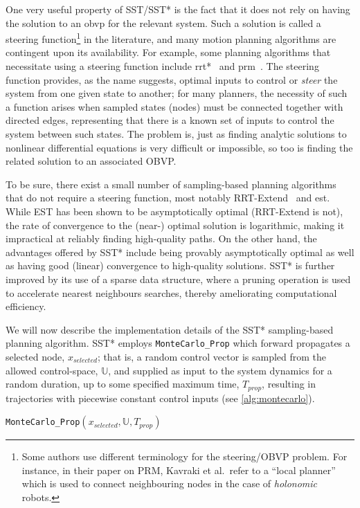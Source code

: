 One very useful property of SST/SST* is the fact that it does not rely on having the solution to an \gls{obvp} for the relevant system. Such a solution is called a steering function\footnote{Some authors use different terminology for the steering/OBVP problem. For instance, in their paper on PRM, Kavraki et al.\ refer to a ``local planner'' which is used to connect neighbouring nodes in the case of \emph{holonomic} robots.} in the literature, and many motion planning algorithms are contingent upon its availability. For example, some planning algorithms that necessitate using a steering function include \gls{rrt}*~\cite{Karaman2011} and \gls{prm}~\cite{Kavraki1996}. The steering function provides, as the name suggests, optimal inputs to control or \emph{steer} the system from one given state to another; for many planners, the necessity of such a function arises when sampled states (nodes) must be connected together with directed edges, representing that there is a known set of inputs to control the system between such states. The problem is, just as finding analytic solutions to nonlinear differential equations is very difficult or impossible, so too is finding the related solution to an associated OBVP\@.

To be sure, there exist a small number of sampling-based planning algorithms that do not require a steering function, most notably RRT-Extend~\cite{LaValle2001} and \gls{est}. While EST has been shown to be asymptotically optimal (RRT-Extend is not), the rate of convergence to the (near-) optimal solution is logarithmic, making it impractical at reliably finding high-quality paths. On the other hand, the advantages offered by SST* include being provably asymptotically optimal as well as having good (linear) convergence to high-quality solutions. SST* is further improved by its use of a sparse data structure, where a pruning operation is used to accelerate nearest neighbours searches, thereby ameliorating computational efficiency.


We will now describe the implementation details of the SST* sampling-based planning algorithm. SST* employs \texttt{MonteCarlo\_Prop} which forward propagates a selected node, $x_{selected}$; that is, a random control vector is sampled from the allowed control-space, $\mathbb{U}$, and supplied as input to the system dynamics for a random duration, up to some specified maximum time, $T_{prop}$, resulting in trajectories with piecewise constant control inputs (see \autoref{alg:montecarlo}).

\begin{algorithm}
\caption{\texttt{MonteCarlo\_Prop}$(x_{selected}, \mathbb{U}, T_{prop})$}
\label{alg:montecarlo}
\begin{algorithmic}[1]
\end{algorithmic}{}
\end{algorithm}


